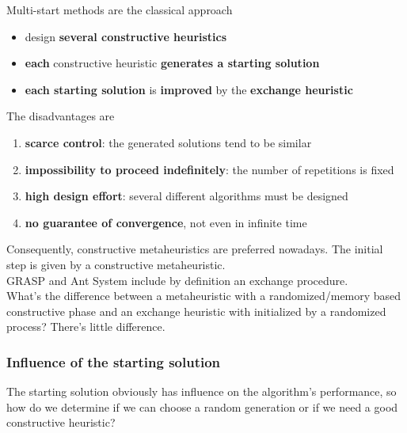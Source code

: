 Multi-start methods are the classical approach
\begin{itemize}
	\item design \textbf{several constructive heuristics}
	\item \textbf{each} constructive heuristic \textbf{generates a starting solution}
	\item \textbf{each starting solution} is \textbf{improved} by the \textbf{exchange heuristic}
\end{itemize}

\nn

The disadvantages are
\begin{enumerate}
	\item \textbf{scarce control}: the generated solutions tend to be similar
	
	\item \textbf{impossibility to proceed indefinitely}: the number of repetitions is fixed
	
	\item \textbf{high design effort}: several different algorithms must be designed
	
	\item \textbf{no guarantee of convergence}, not even in infinite time
\end{enumerate}

Consequently, constructive metaheuristics are preferred nowadays. The initial step is given by a constructive metaheuristic. \\

GRASP and Ant System include by definition an exchange procedure.\\

What's the difference between a metaheuristic with a randomized/memory based constructive phase and an exchange heuristic with initialized by a randomized process? There's little difference.\\

\newpage

\subsubsection{Influence of the starting solution}
The starting solution obviously has influence on the algorithm's performance, so how do we determine if we can choose a random generation or if we need a good constructive heuristic?\\


